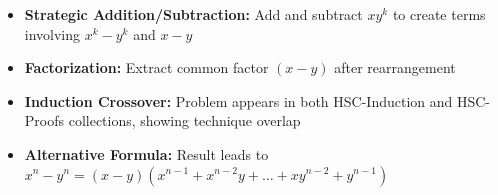 \begin{takeaways}
\begin{itemize}
\item \textbf{Strategic Addition/Subtraction:} Add and subtract $xy^k$ to create terms involving $x^k - y^k$ and $x - y$
\item \textbf{Factorization:} Extract common factor $(x-y)$ after rearrangement
\item \textbf{Induction Crossover:} Problem appears in both HSC-Induction and HSC-Proofs collections, showing technique overlap
\item \textbf{Alternative Formula:} Result leads to $x^n - y^n = (x-y)(x^{n-1} + x^{n-2}y + \ldots + xy^{n-2} + y^{n-1})$
\end{itemize}
\end{takeaways}
